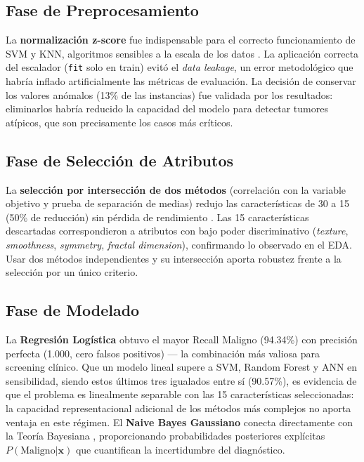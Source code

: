 \documentclass[journal]{IEEEtran}
\begin{document}
\subsection{Fase de Preprocesamiento}
La \textbf{normalización z-score} fue indispensable para el correcto funcionamiento de SVM y KNN, algoritmos sensibles a la escala de los datos \cite{kantardzic, garcia2015}. La aplicación correcta del escalador (\texttt{fit} solo en train) evitó el \textit{data leakage}, un error metodológico que habría inflado artificialmente las métricas de evaluación. La decisión de conservar los valores anómalos (13\% de las instancias) fue validada por los resultados: eliminarlos habría reducido la capacidad del modelo para detectar tumores atípicos, que son precisamente los casos más críticos.

\subsection{Fase de Selección de Atributos}
La \textbf{selección por intersección de dos métodos} (correlación con la variable objetivo y prueba de separación de medias) redujo las características de 30 a 15 (50\% de reducción) sin pérdida de rendimiento \cite{remeseiro2019}. Las 15 características descartadas correspondieron a atributos con bajo poder discriminativo (\textit{texture}, \textit{smoothness}, \textit{symmetry}, \textit{fractal dimension}), confirmando lo observado en el EDA. Usar dos métodos independientes y su intersección aporta robustez frente a la selección por un único criterio.

\subsection{Fase de Modelado}
La \textbf{Regresión Logística} obtuvo el mayor Recall Maligno (94.34\%) con precisión perfecta (1.000, cero falsos positivos) — la combinación más valiosa para screening clínico. Que un modelo lineal supere a SVM, Random Forest y ANN en sensibilidad, siendo estos últimos tres igualados entre sí (90.57\%), es evidencia de que el problema es linealmente separable con las 15 características seleccionadas: la capacidad representacional adicional de los métodos más complejos no aporta ventaja en este régimen. El \textbf{Naive Bayes Gaussiano} conecta directamente con la Teoría Bayesiana \cite{bayesian_med}, proporcionando probabilidades posteriores explícitas $P(\text{Maligno} | \mathbf{x})$ que cuantifican la incertidumbre del diagnóstico.
\end{document}
